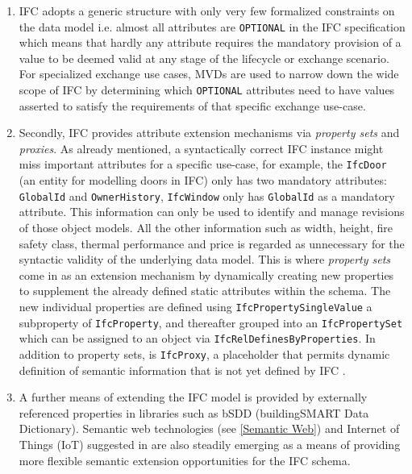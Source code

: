 \begin{enumerate}
	\item 
	\ac{IFC} adopts a generic structure with only very few formalized constraints on the data model i.e. almost all attributes are \texttt{OPTIONAL} in the \ac{IFC} specification which means that hardly any attribute requires the mandatory provision of a value to be deemed valid at any stage of the lifecycle or exchange scenario. For specialized exchange use cases, \acp{MVD} are used to narrow down the wide scope of \ac{IFC} by determining which \texttt{OPTIONAL} attributes need to have values asserted to satisfy the requirements of that specific exchange use-case.     
	\item 
	Secondly, \ac{IFC} provides attribute extension mechanisms via \emph{property sets} and \emph{proxies}. As already mentioned, a syntactically correct \ac{IFC} instance might miss important attributes for a specific use-case, for example, the \texttt{IfcDoor} (an entity for modelling doors in \ac{IFC}) only has two mandatory attributes: \texttt{GlobalId} and \texttt{OwnerHistory}, \texttt{IfcWindow} only has \texttt{GlobalId} as a mandatory attribute. This information can only be used to identify and manage revisions of those object models. All the other information such as width, height, fire safety class, thermal performance and price is regarded as unnecessary for the syntactic validity of the underlying data model. This is where \emph{property sets} come in as an extension mechanism by dynamically creating new properties to supplement the already defined static attributes within the schema. The new individual properties are defined using \texttt{IfcPropertySingleValue} a subproperty of \texttt{IfcProperty}, and thereafter grouped into an \texttt{IfcPropertySet} which can be assigned to an object via \texttt{IfcRelDefinesByProperties}. In addition to property sets, is \texttt{IfcProxy}, a placeholder that permits dynamic definition of semantic information that is not yet defined by \ac{IFC} \citep{Borrmann2010}.

     \item 
     A further means of extending the IFC model is provided by externally referenced properties in libraries such as bSDD (buildingSMART Data Dictionary). Semantic web technologies (see \autoref{Semantic Web}) and Internet of Things (IoT) suggested in \cite{Debruyne2017, Jeroen2018, Pauwels, Zhang2015} are also steadily emerging as a means of providing more flexible semantic extension opportunities for the IFC schema. 
\end{enumerate}

